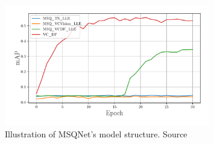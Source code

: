 
\begin{figure}[ht]
    \centering
    \includegraphics[width=0.8\textwidth]{assets/charts/5_2_MSQ_reproduce}
    \caption[Model Structure of MSQNet]{Illustration of MSQNet's model structure. Source \parencite{mondal2023msqnet}}
    \label{fig:implementation_msqnet}
\end{figure}

